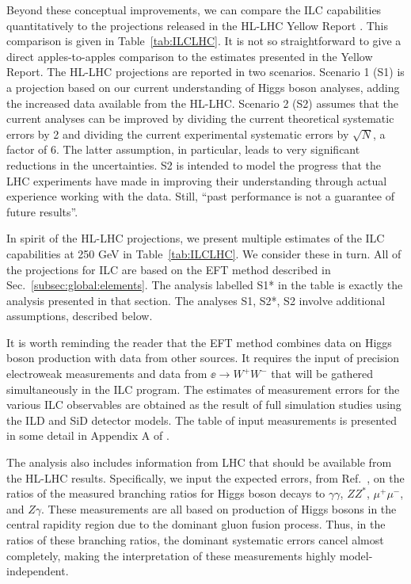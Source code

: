 Beyond these conceptual improvements, we can compare the ILC
capabilities quantitatively to the projections released in the HL-LHC
Yellow Report \cite{YR}.   This comparison is given in
Table~\ref{tab:ILCLHC}.   It is not so straightforward to give a
direct apples-to-apples comparison to the estimates presented in the
Yellow Report.    The HL-LHC projections are reported in two
scenarios.  Scenario 1 (S1) is a projection based on our current
understanding of Higgs boson analyses, adding the increased data
available from the HL-LHC.   Scenario 2 (S2) assumes that the current
analyses can be improved by dividing the current theoretical
systematic errors by 2 and dividing the current experimental
systematic errors by $\sqrt{N}$, a factor of 6.   The latter
assumption, in particular, leads to very significant reductions in the
uncertainties.   S2 is intended to model the progress that the LHC
experiments have made in improving their understanding through actual
experience working with the data.  Still, ``past performance is not a 
guarantee of  future results''.

In spirit of the HL-LHC projections, we present multiple estimates of the ILC
capabilities at 250 GeV  in Table~\ref{tab:ILCLHC}.   We consider
these in turn.  All of the projections for ILC are based on the EFT
method described in Sec.~\ref{subsec:global:elements}.   The analysis
labelled S1* in the table is exactly the analysis presented in that
section.   The analyses S1, S2*, S2 involve additional assumptions,
described below.

It is worth reminding the reader that the EFT method combines data on
Higgs boson production with data from other sources.   It requires the
input of precision electroweak measurements and data from $\ee \to
W^+W^-$ that will be gathered simultaneously in the ILC program.
The estimates of measurement errors
for the various ILC observables  are obtained as the result of  full
simulation studies using the ILD and SiD detector models.   The table
of input measurements is 
presented in some detail in Appendix A of \cite{Barklow:2017suo}. 

The analysis also includes
information from LHC that should be available from the 
HL-LHC results.   Specifically, we input the expected errors, from
Ref.~\cite{YellowBook}, on the ratios of the measured branching ratios
for Higgs boson decays to $\gamma\gamma$,
$ZZ^*$, 
$\mu^+\mu^-$, and  $Z\gamma$.  These measurements are all based on 
production of Higgs bosons in the central rapidity region  due to the 
dominant gluon fusion process.   Thus, in the ratios of these branching
ratios, the dominant systematic errors cancel almost completely,
making the interpretation of these measurements highly
model-independent. 


